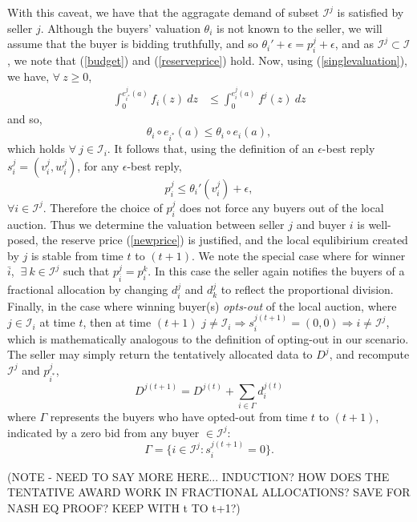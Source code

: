\documentclass[12pt]{article}
\theoremstyle{definition}
\newcommand{\mcI}{\mathcal{I}}
\begin{document}
\begin{multicols}{2}
With this caveat, we have that the aggragate demand of subset $\mcI^j$ is satisfied by seller $j$.
Although the buyers' valuation $\theta_i$ is not known to the seller, we will assume
that the buyer is bidding truthfully, and so ${\theta_i}' + \epsilon
=p_i^j + \epsilon$, and as $\mcI^j\subset \mcI$, we
note that (\ref{budget}) and (\ref{reserveprice}) hold. Now, using
(\ref{singlevaluation}), we have, $\forall \ z\ge 0$,
\begin{align*}
    \int_0^{e_{i^*}^j(a)} f_{i}(z)\ dz &\le\int_0^{e_i^{j}(a)}
f^{j}(z) \ dz 
\end{align*}
and so,
$$
     \theta_i \circ e_{i^*}(a) \le \theta_i \circ e_i(a),
$$
which holds $\forall \ j \in \mcI_i$.
It follows that, using
the definition of an $\epsilon$-best reply $s_i^j = (v_i^j, w_i^j)$,  
for any $\epsilon$-best reply, 
$$
    p_i^j \le {\theta_i}'(v_i^j) + \epsilon,
$$
$\forall i \in \mcI^j$.
Therefore the choice of $p_i^j$ does not force any buyers out of the local
auction. Thus we determine the valuation between seller
$j$ and buyer $i$ is well-posed, the reserve price (\ref{newprice}) is justified, and the local
equlibirium created by $j$ is stable from time $t$ to $(t+1)$. 
We note the special case where for winner $\bar{i}$, $\ \exists \ k\in\mcI^j$
such that $p_{\bar{i}}^j =
p_i^k$. In this case the seller again notifies the buyers of a fractional
allocation by changing $d_i^j$ and $d_k^j$ to reflect the proportional
division. Finally, in the case where winning buyer(s) \emph{opts-out} of the local
auction, where $j\in\mcI_i$ at time $t$, then at time $(t+1)$ $j\ne \mcI_i \Rightarrow s_i^{j(t+1)} = (0,0) \Rightarrow i \ne
\mcI^j$, which is mathematically analogous to the definition of opting-out in our
scenario. The seller may simply return the tentatively allocated data to $D^j$,
and recompute $\mcI^j$ and $p_{i^*}^j$, 
$$
    D^{j(t+1)} = D^{j(t)} + \displaystyle\sum_{i\in\Gamma} d_i^{j(t)}
$$
where $\Gamma$ represents the buyers who have opted-out from time $t$ to 
$(t+1)$, indicated by a zero bid from any buyer $\in \mcI^j$:
$$
    \Gamma = \lbrace i\in \mcI^j : s_i^{j(t+1)} = 0\rbrace.
$$

(NOTE - NEED TO SAY MORE HERE... INDUCTION? HOW DOES THE TENTATIVE AWARD WORK IN
FRACTIONAL ALLOCATIONS? SAVE FOR NASH EQ PROOF? KEEP WITH t TO t+1?)



\end{multicols}
\end{document}
